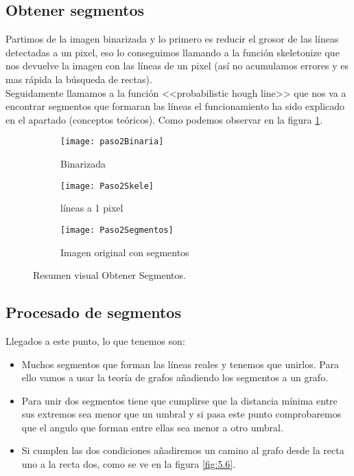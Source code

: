 \subsection{Obtener segmentos}
Partimos de la imagen binarizada y lo primero es reducir el grosor de las líneas detectadas a un pixel, eso lo conseguimos llamando a la función skeletonize que nos devuelve la imagen con las líneas de un pixel (así no acumulamos errores y es mas rápida la búsqueda de rectas).\\
Seguidamente llamamos a la función <<probabilistic hough line>> que nos va a encontrar segmentos que formaran las líneas el funcionamiento ha sido explicado en el apartado (conceptos teóricos). Como podemos observar en la figura \ref{fig:5.5}.


\begin{figure}
\begin{subfigure}[c]{.5\linewidth}
\centering\large \texttt{[image: paso2Binaria]}
\caption{Binarizada}
\end{subfigure}%
\begin{subfigure}[c]{.5\linewidth}
\centering\large \texttt{[image: Paso2Skele]}
\caption{líneas a 1 pixel}
\end{subfigure}
\begin{subfigure}[c]{.5\linewidth}
\centering\large \texttt{[image: Paso2Segmentos]}
\caption{Imagen original con segmentos}
\end{subfigure}
\caption{Resumen visual Obtener Segmentos.}\label{fig:5.5}
\end{figure}

\subsection{Procesado de segmentos}
Llegados a este punto, lo que tenemos son:
\begin{itemize}
\item Muchos segmentos que forman las líneas reales y tenemos que unirlos. Para ello vamos a usar la teoría de grafos añadiendo los segmentos a un grafo.

\item Para unir dos segmentos tiene que cumplirse que la distancia mínima entre sus extremos sea menor que un umbral y si pasa este punto comprobaremos que el angulo que forman entre ellas sea menor a otro umbral.

\item Si cumplen las dos condiciones añadiremos un camino al grafo desde la recta uno a la recta dos, como se ve en la figura \ref{fig:5.6}.
\end{itemize}


